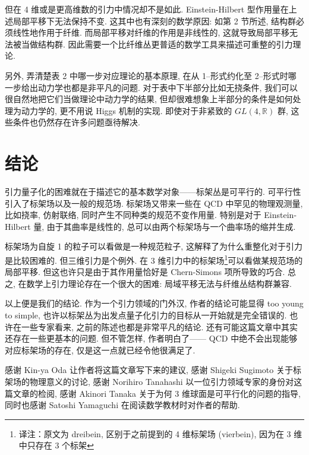 \documentclass{article}
\begin{document}
但在 4 维或是更高维数的引力中情况却不是如此. Einstein-Hilbert 型作用量在上述局部平移下无法保持不变. 这其中也有深刻的数学原因: 如第 2 节所述, 结构群必须线性地作用于纤维. 而局部平移对纤维的作用是非线性的, 这就导致局部平移无法被当做结构群. 因此需要一个比纤维丛更普适的数学工具来描述可重整的引力理论.

另外, 弄清楚表 2 中哪一步对应理论的基本原理, 在从 1--形式约化至 2--形式时哪一步给出动力学也都是非平凡的问题. 对于表中下半部分比如无挠条件, 我们可以很自然地把它们当做理论中动力学的结果, 但却很难想象上半部分的条件是如何处理为动力学的, 更不用说 Higgs 机制的实现. 即使对于非紧致的 $GL(4,\mathbb{R})$ 群, 这些条件也仍然存在许多问题亟待解决.
\section{结论}
引力量子化的困难就在于描述它的基本数学对象——标架丛是可平行的. 可平行性引入了标架场以及一般的规范场. 标架场又带来一些在 QCD 中罕见的物理观测量, 比如挠率, 仿射联络, 同时产生不同种类的规范不变作用量. 特别是对于 Einstein-Hilbert 量, 由于其曲率是线性的, 总可以由两个标架场与一个曲率场的缩并生成.

标架场为自旋 1 的粒子可以看做是一种规范粒子, 这解释了为什么重整化对于引力是比较困难的. 但三维引力是个例外. 在 3 维引力中的标架场\footnote{译注：原文为 dreibein, 区别于之前提到的 4 维标架场 (vierbein), 因为在 3 维中只存在 3 个标架}可以看做某规范场的局部平移. 但这也许只是由于其作用量恰好是 Chern-Simons 项所导致的巧合. 总之, 在数学上引力理论存在一个很大的困难: 局域平移无法与纤维丛结构群兼容.

以上便是我们的结论. 作为一个引力领域的门外汉, 作者的结论可能显得 too young to simple, 也许以标架丛为出发点量子化引力的目标从一开始就是完全错误的. 也许在一些专家看来, 之前的陈述也都是非常平凡的结论. 还有可能这篇文章中其实还存在一些更基本的问题. 但不管怎样, 作者明白了—— QCD 中绝不会出现能够对应标架场的存在, 仅是这一点就已经令他很满足了.

感谢 Kin-ya Oda 让作者将这篇文章写下来的建议, 感谢 Shigeki Sugimoto 关于标架场的物理意义的讨论, 感谢 Norihiro Tanahashi 以一位引力领域专家的身份对这篇文章的检阅, 感谢 Akinori Tanaka 关于为何 3 维球面是可平行化的问题的指导, 同时也感谢 Satoshi Yamaguchi 在阅读数学教材时对作者的帮助.
\end{document}
